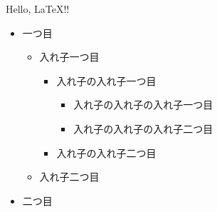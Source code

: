 \documentclass{article}
\begin{document}
Hello, LaTeX!!
\begin{itemize}
    \item 一つ目
    \begin{itemize}
      \item 入れ子一つ目
      \begin{itemize}
        \item 入れ子の入れ子一つ目
        \begin{itemize}
          \item 入れ子の入れ子の入れ子一つ目
          \item 入れ子の入れ子の入れ子二つ目
        \end{itemize}
        \item 入れ子の入れ子二つ目
      \end{itemize}
      \item 入れ子二つ目
    \end{itemize}
    \item 二つ目
  \end{itemize}
\end{document}
